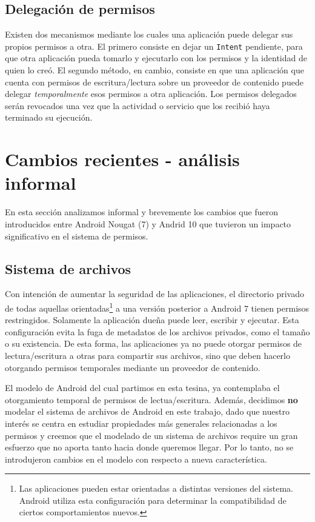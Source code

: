 \subsection*{Delegación de permisos}
Existen dos mecanismos mediante los cuales una aplicación puede delegar sus propios permisos a otra. El
primero consiste en dejar un \texttt{Intent} pendiente, para que otra aplicación pueda tomarlo y
ejecutarlo con los permisos y la identidad de quien lo creó. El segundo método, en cambio, consiste en
que una aplicación que cuenta con permisos de escritura/lectura sobre un proveedor de contenido puede
delegar \textit{temporalmente} esos permisos a otra aplicación. Los permisos delegados serán revocados
una vez que la actividad o servicio que los recibió haya terminado su ejecución.

\section{Cambios recientes - análisis informal}
\label{section:recent-changes}
En esta sección analizamos informal y brevemente los cambios que fueron introducidos entre Android Nougat
(7) y Andrid 10 que tuvieron un impacto significativo en el sistema de permisos.

\subsection{Sistema de archivos}
\label{subsection:recent-changes:filesystem}
Con intención de aumentar la seguridad de las aplicaciones, el directorio privado de todas aquellas
orientadas\footnote{
    
    Las aplicaciones pueden estar orientadas a distintas versiones del sistema. Android utiliza esta
    configuración para determinar la compatibilidad de ciertos comportamientos nuevos.

} a una versión posterior a Android 7 tienen permisos restringidos. Solamente la aplicación dueña puede
leer, escribir y ejecutar. Esta configuración evita la fuga de metadatos de los archivos privados, como
el tamaño o su existencia. De esta forma, las aplicaciones ya no puede otorgar permisos de
lectura/escritura a otras para compartir sus archivos, sino que deben hacerlo otorgando permisos
temporales mediante un proveedor de contenido.

El modelo de Android del cual partimos en esta tesina, ya contemplaba el otorgamiento temporal de
permisos de lectua/escritura. Además, decidimos \textbf{no} modelar el sistema de archivos de Android en
este trabajo, dado que nuestro interés se centra en estudiar propiedades más generales relacionadas a los
permisos y creemos que el modelado de un sistema de archivos require un gran esfuerzo que no aporta tanto
hacia donde queremos llegar. Por lo tanto, no se introdujeron cambios en el modelo con respecto a nueva
característica.

